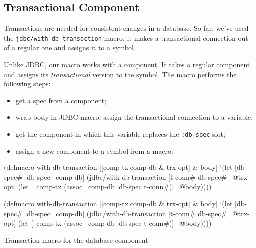 \fi

\subsection{Transactional Component}


Transactions are needed for consistent changes in a database. So far, we've used the \verb|jdbc/with-db-transaction| macro. It makes a transactional connection out of a regular one and assigns it to a symbol.

Unlike JDBC, our macro works with a component. It takes a regular component and assigns its \emph{transactional} version to the symbol. The macro performs the following steps:

\begin{itemize}

\item
  get a spec from a component;

\item
  wrap body in JDBC macro, assign the transactional connection to a variable;

\item
  get the component in which this variable replaces the \verb|:db-spec| slot;

\item
  assign a new component to a symbol from a macro.

\end{itemize}

\begin{listing}[ht!]

\ifnarrow

\begin{english}
  \begin{clojure}
(defmacro with-db-transaction
  [[comp-tx comp-db & trx-opt] & body]
  `(let [{db-spec# :db-spec} ~comp-db]
     (jdbc/with-db-transaction
       [t-conn# db-spec# ~@trx-opt]
       (let [~comp-tx
             (assoc ~comp-db
               :db-spec t-conn#)]
         ~@body))))
  \end{clojure}
\end{english}

\else

\begin{english}
  \begin{clojure}
(defmacro with-db-transaction
  [[comp-tx comp-db & trx-opt] & body]
  `(let [{db-spec# :db-spec} ~comp-db]
     (jdbc/with-db-transaction
       [t-conn# db-spec# ~@trx-opt]
       (let [~comp-tx (assoc ~comp-db :db-spec t-conn#)]
         ~@body))))
  \end{clojure}
\end{english}

\fi

\caption{Transaction macro for the database component}
\label{fig:trx-macro}

\end{listing}

